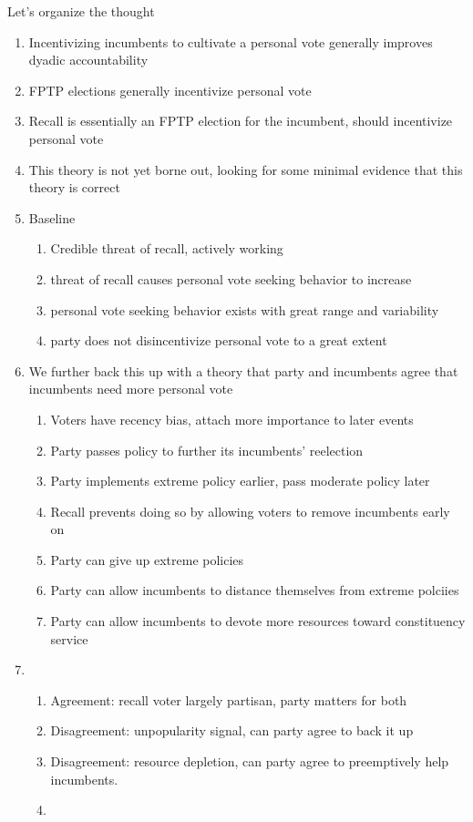 \documentclass[hyphens, crop=false]{standalone}
\begin{document}
	
	Let's organize the thought
	\begin{enumerate}
		\item
		Incentivizing incumbents to cultivate a personal vote generally improves dyadic accountability
		\item
		FPTP elections generally incentivize personal vote
		\item
		Recall is essentially an FPTP election for the incumbent, should incentivize personal vote
		\item
		This theory is not yet borne out, looking for some minimal evidence that this theory is correct
		\item
		Baseline
		\begin{enumerate}
			\item
			Credible threat of recall, actively working
			\item
			threat of recall causes personal vote seeking behavior to increase
			\item
			personal vote seeking behavior exists with great range and variability
			\item
			party does not disincentivize personal vote to a great extent
		\end{enumerate}
		\item
		We further back this up with a theory that party and incumbents agree that incumbents need more personal vote
		\begin{enumerate}
			\item
			Voters have recency bias, attach more importance to later events
			\item
			Party passes policy to further its incumbents' reelection
			\item
			Party implements extreme policy earlier, pass moderate policy later
			\item
			Recall prevents doing so by allowing voters to remove incumbents early on
			\item
			Party can give up extreme policies
			\item
			Party can allow incumbents to distance themselves from extreme polciies
			\item
			Party can allow incumbents to devote more resources toward constituency service
		\end{enumerate}
		\item
		\begin{enumerate}
			\item
			Agreement: recall voter largely partisan, party matters for both
			\item
			Disagreement: unpopularity signal, can party agree to back it up
			\item
			Disagreement: resource depletion, can party agree to preemptively help incumbents.
			\item
			

\end{enumerate}
\end{enumerate}
\end{document}

